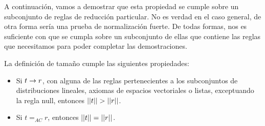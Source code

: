 A continuación, vamos a demostrar que esta propiedad se cumple sobre un subconjunto de reglas de reducción particular. No es verdad en el caso general, de otra forma sería una prueba de normalización fuerte. De todas formas, nos es suficiente con que se cumpla sobre un subconjunto de ellas que contiene las reglas que necesitamos para poder completar las demostraciones.

\begin{lemma}\label{lem:size}
  La definición de tamaño cumple las siguientes propiedades:
  \begin{itemize}
    \item Si \( t \rightarrow r \), con alguna de las reglas pertenecientes a los subconjuntos de distribuciones lineales, axiomas de espacios vectoriales o listas, exceptuando la regla \textsf{null}, entonces \( ||t|| > ||r|| \).
    \item Si \( t =_{AC} r \), entonces \( ||t|| = ||r|| \).
  \end{itemize}
\end{lemma}

